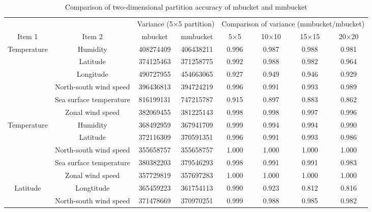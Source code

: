 \begin{table}[hbt]
\begin{center}
\caption{Comparison of two-dimensional partition accuracy of mbucket and mmbucket\label{tbl:mmbucket_table1}}
{\footnotesize
\begin{tabular}{c|c||c|c|c|c|c|c}
\hline
            &          & \multicolumn{2}{|c|}{Variance (5×5 partition)} & \multicolumn{4}{|c}{Comparison of variance (mmbucket/mbucket)} \\  \cline{3-4}  \cline{5-8}
Item 1       & Item 2    & mbucket  & mmbucket & 5×5  &10×10 &15×15 & 20×20\\ \hline\hline
Temperature        & Humidity     &408274409 &406438211 &0.996 &0.987 &0.988 &0.981 \\
            & Latitude     &374125463 &371258775 &0.992 &0.988 &0.982 &0.964 \\
            & Longitude     &490727955 &454663065 &0.927 &0.949 &0.946 &0.929 \\
            & North-south wind speed &396436813 &394724219 &0.996 &0.991 &0.993 &0.989 \\
            & Sea surface temperature &816199131 &747215787 &0.915 &0.897 &0.883 &0.862 \\
            & Zonal wind speed &382069455 &381225143 &0.998 &0.998 &0.997 &0.996 \\  \hline
Temperature        & Humidity     &368492959 &367941709 &0.999 &0.994 &0.994 &0.990 \\
            & Latitude     &372116309 &370591351 &0.996 &0.991 &0.993 &0.986 \\
            & North-south wind speed &355658757 &355658757 &1.000 &1.000 &1.000 &1.000 \\
            & Sea surface temperature &380382203 &379546293 &0.998 &0.991 &0.991 &0.983 \\
            & Zonal wind speed &357729819 &357697283 &1.000 &1.000 &1.000 &1.000 \\ \hline
Latitude        & Longtitude     &365459223 &361754113 &0.990 &0.923 &0.812 &0.816 \\
            & North-south wind speed &371478669 &370970251 &0.999 &0.988 &0.985 &0.982 \\

\end{tabular}}
\end{center}
\end{table}
